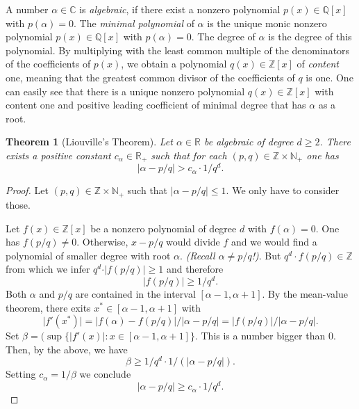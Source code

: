 \documentclass[a4paper,11pt,american]{article}
\newcommand{\N}{\mathbb{N}}
\newcommand{\Q}{\mathbb{Q}}
\newcommand{\R}{\mathbb{R}}
\newcommand{\Z}{\mathbb{Z}}
\newcommand{\C}{\mathbb{C}}
\theoremstyle{plain}
\newtheorem{theorem}{Theorem}
\theoremstyle{definition}
\begin{document}
A number $\alpha \in\C$ is \emph{algebraic}, if there exist a nonzero polynomial $p(x) \in \Q[x]$ with $p(\alpha) = 0$. The \emph{minimal polynomial} of $\alpha$ is the unique monic nonzero polynomial $p(x) \in\Q[x]$ with $p(\alpha) = 0$. The degree of $\alpha$ is the degree of this polynomial.  By multiplying with the least common multiple of the denominators of the coefficients of $p(x)$, we obtain a polynomial $q(x) \in\Z[x]$ of \emph{content} one, meaning that the greatest common divisor of the coefficients of $q$ is one. One can easily see that there is a unique nonzero polynomial $q(x) \in\Z[x]$ with content one and positive leading coefficient of minimal degree that has $\alpha$ as a root.

\begin{theorem}[Liouville's Theorem]
  \label{thr:5}
  Let $\alpha\in\R$ be algebraic of degree $d\geq2$. There exists a positive constant $c_\alpha \in \R_+$ such that for each $(p,q) \in \Z \times \N_+$ one has
  \begin{displaymath}
    \vert  \alpha - p/q \vert  > c_\alpha\cdot 1/q^d. 
  \end{displaymath}
\end{theorem}

\begin{proof}
  Let $(p,q) \in \Z \times\N_+$ such that  $\vert  \alpha - p/q \vert  \leq1$. We only have to consider those. 

  Let $f(x) \in \Z[x]$ be a nonzero polynomial of degree $d$ with $f(\alpha) = 0$.  One has $f(p/q) \neq 0$. Otherwise, $x- p/q$ would divide $f$ and we would find a polynomial of smaller degree with root $\alpha$. \emph{(Recall $\alpha \neq p/q$!)}.  But $q^d \cdot f(p/q) \in\Z$ from which we infer $q^d \cdot \vert f(p/q)\vert  \geq1$ and therefore 
  \begin{displaymath}
     \vert f(p/q)\vert  \geq1 / q^d. 
   \end{displaymath}
   Both $\alpha$ and $p/q$ are contained in the interval $[\alpha -1, \alpha+1]$. 
  By the mean-value theorem, there exits $x^* \in [\alpha -1, \alpha+1]$ with
  \begin{displaymath}
    \vert f'(x^*)\vert  = \vert f(\alpha) - f(p/q)\vert  / \vert \alpha - p/q\vert  = \vert f(p/q)\vert  / \vert \alpha - p/q\vert  . 
  \end{displaymath}
  Set $\beta = (\sup\{ \vert f'(x)\vert:x \in [\alpha-1 ,\alpha+1]\}$. This is a number bigger than $0$.   Then, by the above, we have 
  \begin{displaymath}
    \beta \geq 1/q^d\cdot 1/ (\vert \alpha - p/q\vert). 
  \end{displaymath}
  Setting $c_\alpha = 1/ \beta$ we conclude 
  \begin{displaymath}
    \vert \alpha - p/q\vert  \geq c_\alpha \cdot 1/q^d . 
  \end{displaymath}
\end{proof}
\end{document}
